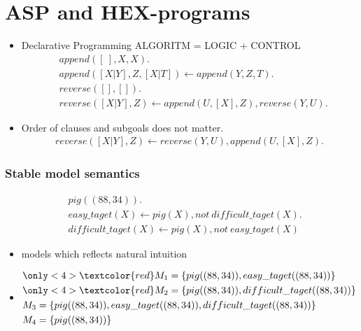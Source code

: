 \documentclass[smaller, dvipsnames]{beamer}
\begin{document}
\section{ASP and HEX-programs}
\begin{frame}
 	\begin{center}
 	\begin{itemize}
	\item<1->[] Declarative Programming ALGORITM = LOGIC + CONTROL
		\begin{align*}
			&append ([\:], X, X). \\
			&append ([X|Y], Z, [X|T ]) \leftarrow append (Y, Z, T ). \\
			&reverse([ ], [ ]).\\
			&reverse([X|Y ], Z) \leftarrow append (U, [X], Z), reverse(Y, U ).
		\end{align*}
  \item<2>[] Order of clauses and subgoals does not matter.
  		\begin{align*}
			reverse([X|Y ], Z) \leftarrow reverse(Y, U ), append (U, [X], Z).
		\end{align*}
	\end{itemize}	
	\end{center}
 
\end{frame}

\begin{frame}
    \frametitle{Stable model semantics}
    \begin{center}
    	\begin{align*}
			&pig((88,34)). \\
			&easy\_taget(X) \leftarrow pig(X), not\: difficult\_taget(X). \\ 
			&difficult\_taget(X) \leftarrow pig(X), not\: easy\_taget(X) 
		\end{align*}
    \end{center}
    \begin{itemize}
    	\item<2->[] models which reflects natural intuition
    	\item<3->[]
    		\begin{align*}
				&\only<4>{\textcolor{red}}{ M_1= \{pig((88,34)), easy\_taget((88,34))\}  } \\
				&\only<4>{\textcolor{red}}{ M_2= \{pig((88,34)), difficult\_taget((88,34))\}  }\\
				&M_3= \{pig((88,34)), easy\_taget((88,34)), difficult\_taget((88,34))\} \\
				&M_4= \{pig((88,34))\} \\
    		\end{align*}
    \end{itemize}
\end{frame}
\end{document}
